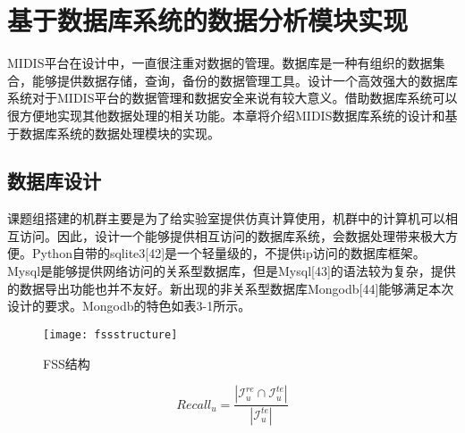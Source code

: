 \newpage

\section{基于数据库系统的数据分析模块实现}

MIDIS平台在设计中，一直很注重对数据的管理。数据库是一种有组织的数据集合，能够提供数据存储，查询，备份的数据管理工具。设计一个高效强大的数据库系统对于MIDIS平台的数据管理和数据安全来说有较大意义。借助数据库系统可以很方便地实现其他数据处理的相关功能。本章将介绍MIDIS数据库系统的设计和基于数据库系统的数据处理模块的实现。

\subsection{数据库设计}

课题组搭建的机群主要是为了给实验室提供仿真计算使用，机群中的计算机可以相互访问。因此，设计一个能够提供相互访问的数据库系统，会数据处理带来极大方便。Python自带的sqlite3[42]是一个轻量级的，不提供ip访问的数据库框架。Mysql是能够提供网络访问的关系型数据库，但是Mysql[43]的语法较为复杂，提供的数据导出功能也并不友好。新出现的非关系型数据库Mongodb[44]能够满足本次设计的要求。Mongodb的特色如表3-1所示。
\begin{figure}[htbp]
	\begin{center}
		\texttt{[image: fssstructure]}
		\caption{FSS结构}
		\label{gra4}
	\end{center}
\end{figure}

\begin{equation}
    Recall_u = \frac{|\mathcal{I}_u^{re} \cap \mathcal{I}_u^{te}|}{|\mathcal{I}_u^{te}|}
    \end{equation}